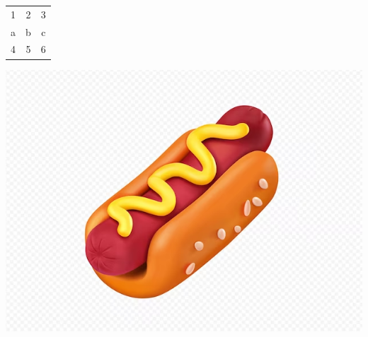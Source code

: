 \documentclass{article}
\begin{document}
\begin{tabular}{|c|c|c|}
1 & 2 & 3 \\
a & b & c \\
4 & 5 & 6 \\
\end{tabular}

\includegraphics{artifacts/extra/image.png}
\end{document}
